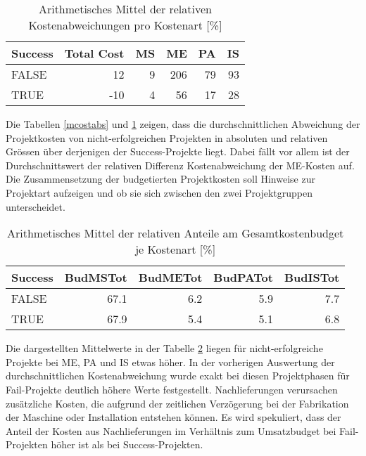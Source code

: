 \begin{table}[H]
	\centering
	\caption{Arithmetisches Mittel der relativen Kostenabweichungen pro Kostenart [\%]}
	\begin{tabular}{lrrrrr}
		\textbf{Success} & \multicolumn{1}{l}{\textbf{Total Cost}} & \multicolumn{1}{l}{\textbf{MS}} & \multicolumn{1}{l}{\textbf{ME}} & \multicolumn{1}{l}{\textbf{PA}} & \multicolumn{1}{l}{\textbf{IS}}
		\\\hline
		FALSE & 12    & 9     & 206   & 79    & 93 \\
		TRUE  & -10   & 4     & 56    & 17    & 28 \\
	\end{tabular}%
	\label{mcostrel}%
\end{table}%
Die Tabellen \ref{mcostabs} und \ref{mcostrel} zeigen, dass die durchschnittlichen Abweichung der Projektkosten von nicht-erfolgreichen Projekten in absoluten und relativen Grössen über derjenigen der Success-Projekte liegt. Dabei fällt vor allem ist der Durchschnittswert der relativen Differenz Kostenabweichung der ME-Kosten auf.
\newline\newline Die Zusammensetzung der budgetierten Projektkosten soll Hinweise zur Projektart aufzeigen und ob sie sich zwischen den zwei Projektgruppen unterscheidet.
\begin{table}[htbp]
	\centering
	\caption{Arithmetisches Mittel der relativen Anteile am Gesamtkostenbudget je Kostenart [\%]}
	\begin{tabular}{lrrrr}
		\textbf{Success} & \multicolumn{1}{l}{\textbf{BudMSTot}} & \multicolumn{1}{l}{\textbf{BudMETot}} & \multicolumn{1}{l}{\textbf{BudPATot}} & \multicolumn{1}{l}{\textbf{BudISTot}} \\\hline
		FALSE & 67.1  & 6.2   & 5.9   & 7.7 \\
		TRUE  & 67.9  & 5.4   & 5.1   & 6.8 \\
	\end{tabular}%
	\label{mbudtot}%
\end{table}%
Die dargestellten Mittelwerte in der Tabelle \ref{mbudtot} liegen für nicht-erfolgreiche Projekte bei ME, PA und IS etwas höher. In der vorherigen Auswertung der durchschnittlichen Kostenabweichung wurde exakt bei diesen Projektphasen für Fail-Projekte deutlich höhere Werte festgestellt.
%
%
\newline\newline Nachlieferungen verursachen zusätzliche Kosten, die aufgrund der zeitlichen Verzögerung bei der Fabrikation der Maschine oder Installation entstehen können. Es wird spekuliert, dass der Anteil der Kosten aus Nachlieferungen im Verhältnis zum Umsatzbudget bei Fail-Projekten höher ist als bei Success-Projekten.
